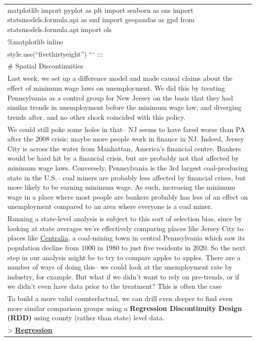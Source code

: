 \documentclass[
  letterpaper,
  DIV=11,
  numbers=noendperiod]{scrreprt}
\begin{document}
\begin{longtable}[]{@{}
  >{\raggedright\arraybackslash}p{}@{}}
matplotlib import pyplot as plt import seaborn as sns import
statsmodels.formula.api as smf import geopandas as gpd from
statsmodels.formula.api import ols \\
\%matplotlib inline \\
style.use(``fivethirtyeight'') ``` ::: \\
\# Spatial Discontinuities \\
Last week, we set up a difference model and made causal claims about the
effect of minimum wage laws on unemployment. We did this by treating
Pennsylvania as a control group for New Jersey on the basis that they
had similar trends in unemployment before the minimum wage law, and
diverging trends after, and no other shock coincided with this
policy. \\
We could still poke some holes in that-- NJ seems to have fared worse
than PA after the 2008 crisis; maybe more people work in finance in NJ.
Indeed, Jersey City is across the water from Manhattan, America's
financial centre. Bankers would be hard hit by a financial crisis, but
are probably not that affected by minimum wage laws. Conversely,
Pennsylvania is the 3rd largest coal-producing state in the U.S.-- coal
miners are probably less affected by financial crises, but more likely
to be earning minimum wage. As such, increasing the minimum wage in a
place where most people are bankers probably has less of an effect on
unemployment compared to an area where everyone is a coal miner. \\
Running a state-level analysis is subject to this sort of selection
bias, since by looking at state averages we're effectively comparing
places like Jersey City to places like
\href{https://en.wikipedia.org/wiki/Centralia,_Pennsylvania}{Centralia},
a coal-mining town in central Pennsylvania which saw its population
decline from 1000 in 1980 to just five residents in 2020. So the next
step in our analysis might be to try to compare apples to apples. There
are a number of ways of doing this-- we could look at the unemployment
rate by industry, for example. But what if we didn't want to rely on
pre-trends, or if we didn't even have data prior to the treatment? This
is often the case \\
To build a more valid counterfactual, we can drill even deeper to find
even more similar comparison groups using a \textbf{Regression
Discontinuity Design (RDD)} using county (rather than state) level
data. \\
\textgreater{}
\textbf{\href{https://www.princeton.edu/~davidlee/wp/RDDEconomics.pdf}{Regression
}}
\end{longtable}
\end{document}

